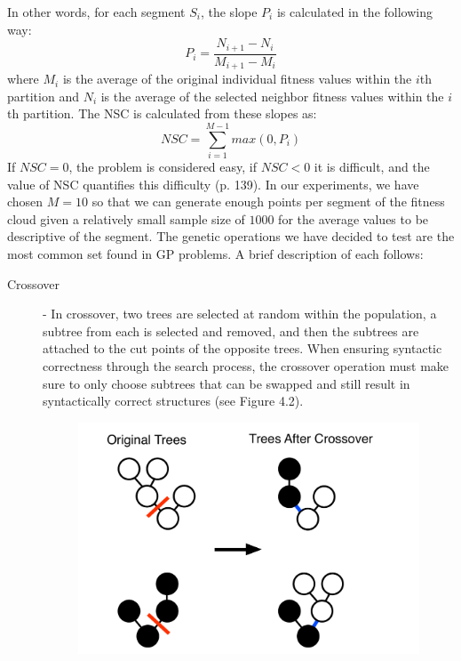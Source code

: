 \documentclass[12pt]{report} 	%
\numberwithin{figure}{chapter}
\numberwithin{table}{chapter}
\numberwithin{equation}{chapter}
\begin{document}
\begin{flushleft}
In other words, for each segment $S_i$, the slope $P_i$ is calculated in the following way:
\begin{equation}
P_i = \frac{N_{i+1}-N_i}{M_{i+1}-M_i}
\end{equation}
where $M_i$ is the average of the original individual fitness values within the $i$th partition and $N_i$ is the average of the selected neighbor fitness values within the $i$th partition. The NSC is calculated from these slopes as:
\begin{equation}
NSC = \sum_{i=1}^{M-1} max(0, P_i)
\end{equation}
If $NSC = 0$, the problem is considered easy, if $NSC < 0$ it is difficult, and the value of NSC quantifies this difficulty (p. 139). In our experiments, we have chosen $M=10$ so that we can generate enough points per segment of the fitness cloud given a relatively small sample size of $1000$ for the average values to be descriptive of the segment.
The genetic operations we have decided to test are the most common set found in GP problems. A brief description of each follows:
\begin{description}
\item [Crossover] - In crossover, two trees are selected at random within the population, a subtree from each is selected and removed, and then the subtrees are attached to the cut points of the opposite trees. When ensuring syntactic correctness through the search process, the crossover operation must make sure to only choose subtrees that can be swapped and still result in syntactically correct structures (see Figure 4.2). 
\begin{figure}[h!]
\begin{center}
\includegraphics[scale=0.5]{Crossover}

\end{center}
\end{figure}
\end{description}
\end{flushleft}
\end{document}
